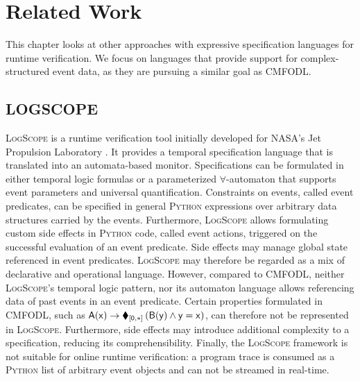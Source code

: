 \chapter{Related Work}
\label{chap:related_work}

This chapter looks at other approaches with expressive specification languages for runtime verification. We focus on languages that provide support for complex-structured event data, as they are pursuing a similar goal as CMFODL.

\section{LOGSCOPE}
\textsc{LogScope} is a runtime verification tool initially developed for NASA's Jet Propulsion Laboratory \cite{barringerFormalAnalysisLog2010}. It provides a temporal specification language that is translated into an automata-based monitor. Specifications can be formulated in either temporal logic formulas or a parameterized $\forall$-automaton that supports event parameters and universal quantification. Constraints on events, called event predicates, can be specified in general \textsc{Python} expressions over arbitrary data structures carried by the events. Furthermore, \textsc{LogScope} allows formulating custom side effects in \textsc{Python} code, called event actions, triggered on the successful evaluation of an event predicate. Side effects may manage global state referenced in event predicates. \textsc{LogScope} may therefore be regarded as a mix of declarative and operational language. However, compared to CMFODL, neither \textsc{LogScope}'s temporal logic pattern, nor its automaton language allows referencing data of past events in an event predicate. Certain properties formulated in CMFODL, such as $\mathsf{A(x) \to \operatorname{\blacklozenge}_{[0,*]} \left( B(y) \land y = x \right)}$, can therefore not be represented in \textsc{LogScope}. Furthermore, side effects may introduce additional complexity to a specification, reducing its comprehensibility. Finally, the \textsc{LogScope} framework is not suitable for online runtime verification: a program trace is consumed as a \textsc{Python} list of arbitrary event objects and can not be streamed in real-time.

